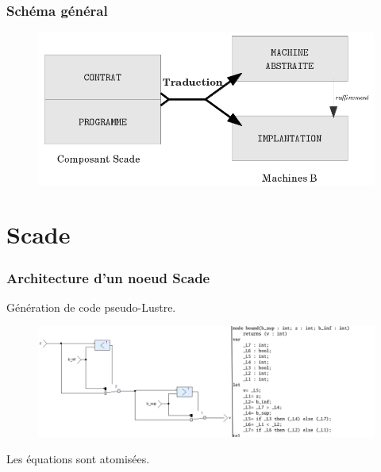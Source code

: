 \documentclass[10pt]{beamer}
\begin{document}
\begin{frame}
\frametitle{Schéma général}
\begin{figure}[h]
  \begin{center}
    \includegraphics[scale=0.4]{intro_schema2.png}
  \end{center}
\end{figure}
\end{frame}



\section{Scade}
\frame{\sectionpage}

\begin{frame}
\frametitle{Architecture d'un noeud Scade}
Génération de code pseudo-Lustre.
\begin{figure}[h]
  \begin{center}
    \includegraphics[scale=0.27]{1_ex2.png}
  \end{center}
\end{figure}
Les équations sont atomisées.
\end{frame}
\end{document}
